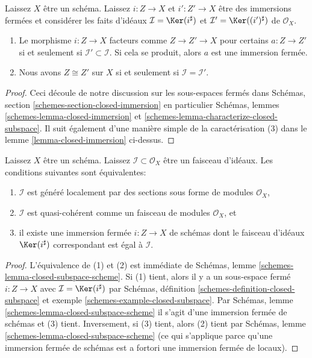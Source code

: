 \begin{lemma}

\label{lemma-closed-immersion-ideals}
Laissez $X$ être un schéma. Laissez $i : Z \to X$ et $i' : Z' \to X$ être des immersions fermées et considérer les faits d'idéaux $\mathcal{I} = \Ker(i^\sharp)$ et $\mathcal{I}' = \Ker((i')^\sharp)$ de $\mathcal{O}_X$.
\begin{enumerate}
\item Le morphisme $i : Z \to X$ facteurs comme $Z \to Z' \to X$ pour certains $a : Z \to Z'$ si et seulement si $\mathcal{I}' \subset \mathcal{I}$. Si cela se produit, alors $a$ est une immersion fermée.
\item Nous avons $Z \cong Z'$ sur $X$ si et seulement si $\mathcal{I} = \mathcal{I}'$.
\end{enumerate}

\end{lemma}

\begin{proof}
Ceci découle de notre discussion sur les sous-espaces fermés dans Schémas, section \ref{schemes-section-closed-immersion} en particulier Schémas, lemmes \ref{schemes-lemma-closed-immersion} et \ref{schemes-lemma-characterize-closed-subspace}. Il suit également d'une manière simple de la caractérisation (3) dans le lemme \ref{lemma-closed-immersion} ci-dessus.
\end{proof}

\begin{lemma}

\label{lemma-closed-immersion-bijection-ideals}
Laissez $X$ être un schéma. Laissez $\mathcal{I} \subset \mathcal{O}_X$ être un faisceau d'idéaux. Les conditions suivantes sont équivalentes:
\begin{enumerate}
\item $\mathcal{I}$ est généré localement par des sections sous forme de modules $\mathcal{O}_X$,
\item $\mathcal{I}$ est quasi-cohérent comme un faisceau de modules $\mathcal{O}_X$, et
\item il existe une immersion fermée $i : Z \to X$ de schémas dont le faisceau d'idéaux $\Ker(i^\sharp)$ correspondant est égal à $\mathcal{I}$.
\end{enumerate}

\end{lemma}

\begin{proof}
L'équivalence de (1) et (2) est immédiate de Schémas, lemme \ref{schemes-lemma-closed-subspace-scheme}. Si (1) tient, alors il y a un sous-espace fermé $i : Z \to X$ avec $\mathcal{I} = \Ker(i^\sharp)$ par Schémas, définition \ref{schemes-definition-closed-subspace} et exemple \ref{schemes-example-closed-subspace}. Par Schémas, lemme \ref{schemes-lemma-closed-subspace-scheme} il s'agit d'une immersion fermée de schémas et (3) tient. Inversement, si (3) tient, alors (2) tient par Schémas, lemme \ref{schemes-lemma-closed-subspace-scheme} (ce qui s'applique parce qu'une immersion fermée de schémas est a fortori une immersion fermée de locaux).
\end{proof}

